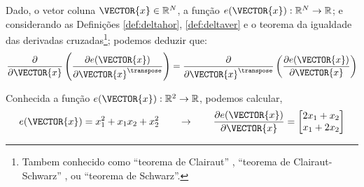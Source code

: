 \begin{comment}
Assim, 
$\frac{\partial e(\VECTOR{x}) }{\partial \VECTOR{x}} \in \mathbb{R}^{N \times 1}$,
$\frac{\partial \VECTOR{f}(\VECTOR{x}) }{\partial \VECTOR{x}} \in \mathbb{R}^{(MN) \times 1}$ e
$\frac{\partial \VECTOR{g}(\VECTOR{x}) }{\partial \VECTOR{x}} \in \mathbb{R}^{(MN) \times L}$.
\end{comment}


\begin{corollary}\label{cor:derder}
Dado,
o vetor coluna $\VECTOR{x}\in \mathbb{R}^N$, 
a função $e(\VECTOR{x}): \mathbb{R}^N \rightarrow \mathbb{R}$; e
considerando as Definições \ref{def:deltahor}, \ref {def:deltaver} e o 
teorema da igualdade das derivadas cruzadas\footnote{Tambem conhecido como 
``teorema de Clairaut'' \cite[pp. 885]{stewart2008calculus},
 ``teorema de Clairaut-Schwarz'' \cite[pp. 311]{telles2015matematica}, ou ``teorema de Schwarz''.}; 
podemos deduzir que:
\begin{equation}
 \frac{\partial }{\partial \VECTOR{x}} \left( \frac{\partial e(\VECTOR{x} )}{\partial \VECTOR{x}^{\transpose}} \right) = 
\frac{\partial }{\partial \VECTOR{x}^{\transpose}} \left( \frac{\partial e(\VECTOR{x} )}{\partial \VECTOR{x}} \right)
\end{equation}
\end{corollary}


\begin{example}
Conhecida a função $e(\VECTOR{x}): \mathbb{R}^2 \rightarrow \mathbb{R}$, podemos calcular,
\begin{equation}
e(\VECTOR{x})=x_1^2+x_1 x_2+x_2^2
\qquad \rightarrow \qquad
\frac{\partial e(\VECTOR{x}) }{\partial \VECTOR{x}}=
\begin{bmatrix}
 2 x_1 + x_2 \\
 x_1 + 2 x_2
\end{bmatrix}
\end{equation}
\end{example}


